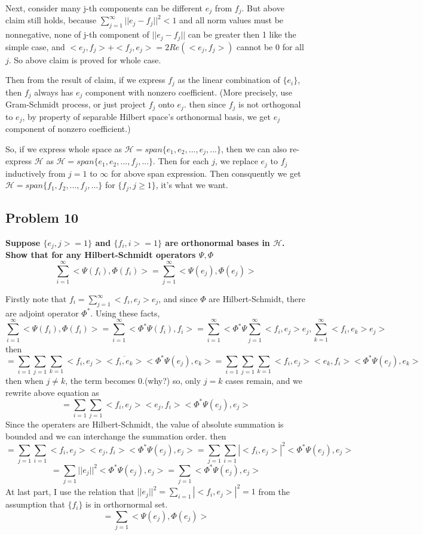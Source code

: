 \documentclass{article}
\begin{document}
Next, consider many j-th components can be different $e_j$ from $f_j$. But above claim still holds, because
\(\sum_{j=1}^\infty ||e_j-f_j||^2<1\) and all norm values must be nonnegative,
none of j-th component of $||e_j-f_j||$ can be greater then 1 like the simple case, 
and $<e_j,f_j>+<f_j,e_j>=2Re(<e_j,f_j>)$ cannot be 0 for all $j$.
So above claim is proved for whole case.


Then from the result of claim, if we express $f_j$ as the linear combination of $\{e_i\}$, 
then $f_j$ always has $e_j$ component with nonzero coefficient.
(More precisely, use Gram-Schmidt process, or just project $f_j$ onto $e_j$.
then since $f_j$ is not orthogonal to $e_j$, by property of separable Hilbert space's orthonormal basis,
we get $e_j$ component of nonzero coefficient.)

So, if we express whole space as \(\mathcal{H}=span\{e_1,e_2,...,e_j,...\}\), then
we can also re-express $\mathcal{H}$ as \(\mathcal{H}=span\{e_1,e_2,...,f_j,...\}\).
Then for each $j$, we replace $e_j$ to $f_j$ inductively from $j=1$ to $\infty$ for above span expression.
Then consquently we get \(\mathcal{H}=span\{f_1,f_2,...,f_j,...\}\) for $\{f_j, j\geq 1\}$, it's what we want.




\subsection{Problem 10}
\textbf{
    Suppose $\{e_j,j>=1\}$ and $\{f_i,i>=1\}$ are orthonormal bases in $\mathcal{H}$.
    Show that for any Hilbert-Schmidt operators $\Psi,\Phi$
    \[\sum_{i=1}^{\infty} <\Psi(f_i), \Phi(f_i)> = \sum_{j=1}^{\infty} <\Psi(e_j),\Phi(e_j)>\]
}

Firstly note that $f_i=\sum_{j=1}^\infty<f_i,e_j>e_j$, 
and since $\Phi$ are Hilbert-Schmidt, there are adjoint operator  $\Phi^*$.
Using these facts,
\[\sum_{i=1}^{\infty} <\Psi(f_i), \Phi(f_i)>
= \sum_{i=1}^{\infty} <\Phi^*\Psi(f_i), f_i> 
= \sum_{i=1}^\infty <\Phi^*\Psi\sum_{j=1}^\infty <f_i,e_j>e_j, \sum_{k=1}^\infty <f_i,e_k>e_j>\]
then
\[=\sum _{i=1}\sum_{j=1}\sum_{k=1}<f_i,e_j>\overline{<f_i,e_k>}<\Phi^*\Psi(e_j),e_k>
=\sum _{i=1}\sum_{j=1}\sum_{k=1}<f_i,e_j><e_k,f_i><\Phi^*\Psi(e_j),e_k>\]
then when $j\neq k$, the term becomes 0.(why?)
so, only $j=k$ cases remain, and we rewrite above equation as
\[=\sum_{i=1}\sum_{j=1} <f_i,e_j><e_j,f_i><\Phi^*\Psi(e_j),e_j>\]
Since the operaters are Hilbert-Schmidt, the value of absolute summation is bounded
and we can interchange the summation order. then
\[=\sum_{j=1}\sum_{i=1} <f_i,e_j><e_j,f_i><\Phi^*\Psi(e_j),e_j>
=\sum_{j=1}\sum_{i=1}|<f_i,e_j>|^2<\Phi^*\Psi(e_j),e_j>\]
\[=\sum_{j=1} ||e_j||^2<\Phi^*\Psi(e_j),e_j>
=\sum_{j=1} <\Phi^*\Psi(e_j),e_j>
\]
At last part, I use the relation that $||e_j||^2=\sum_{i=1}|<f_i,e_j>|^2 = 1$  
from the assumption that $\{f_i\}$ is in orthornormal set.
\[=\sum_{j=1} <\Psi(e_j),\Phi(e_j)>
\]
\end{document}
